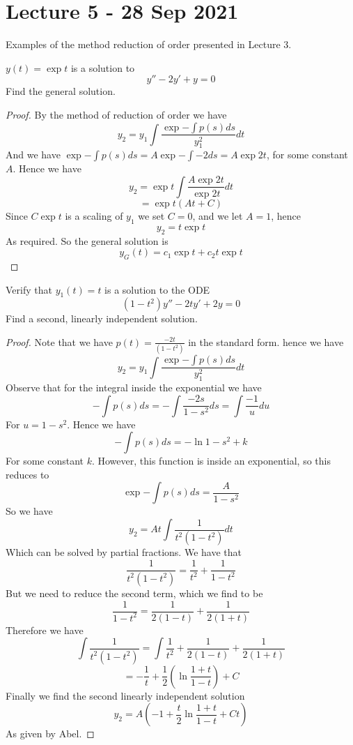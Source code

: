 \section{Lecture 5 - 28 Sep 2021}
Examples of the method reduction of order presented in Lecture 3.
\begin{ex}
  $y(t)=\exp{t}$ is a solution to
  \[ y'' -2y' + y = 0\]
  Find the general solution.
\end{ex}
\begin{proof}
  By the method of reduction of order we have
  \[y_2 = y_1 \int\frac{\exp{-\int p(s)ds}}{y_1^2} dt\]
  And we have $\exp{-\int p(s)ds} = A\exp{-\int -2ds}=A\exp{2t}$, for some constant $A$.
  Hence we have 
  \[y_2 = \exp{t} \int\frac{A\exp{2t}}{\exp{2t}} dt\]
  \[= \exp{t} (At + C)\]
  Since $C\exp{t}$ is a scaling of $y_1$ we set $C=0$, and we let $A=1$, hence 
  \[y_2 = t\exp{t}\]
  As required. So the general solution is 
  \[y_G(t) = c_1\exp{t} + c_2 t\exp{t}\]
\end{proof}

\begin{ex}
  Verify that $y_1(t)=t$ is a solution to the ODE
  \[(1-t^2)y''-2ty'+2y=0\]
  Find a second, linearly independent solution.
\end{ex}
\begin{proof}
  Note that we have $p(t)=\frac{-2t}{(1-t^2)}$ in the standard form. hence we have 
  \[y_2 = y_1 \int \frac{\exp{-\int p(s)ds}}{y_1^2} dt\]
  Observe that for the integral inside the exponential we have
  \[-\int p(s)ds = -\int \frac{-2s}{1-s^2}ds = \int \frac{-1}{u}du\]
  For $u=1-s^2$. Hence we have 
  \[-\int p(s)ds = - \ln{1-s^2} + k\]
  For some constant $k$. However, this function is inside an exponential, so this reduces to 
  \[\exp{-\int p(s)ds} = \frac{A}{1-s^2} \]
  So we have 
  \[y_2 = At \int \frac{1}{t^2(1-t^2)} dt\]
  Which can be solved by partial fractions. We have that
  \[\frac{1}{t^2(1-t^2)} = \frac{1}{t^2} + \frac{1}{1-t^2}\]
  But we need to reduce the second term, which we find to be 
  \[\frac{1}{1-t^2} = \frac{1}{2(1-t)} + \frac{1}{2(1+t)}\]
  Therefore we have
  \[\int \frac{1}{t^2(1-t^2)} = \int \frac{1}{t^2} + \frac{1}{2(1-t)} + \frac{1}{2(1+t)}\]
  \[= -\frac{1}{t} + \frac{1}{2}(\ln{\frac{1+t}{1-t}}) + C\]
  Finally we find the second linearly independent solution
  \[y_2 = A(-1+ \frac{t}{2}\ln{\frac{1+t}{1-t}} + Ct)\]
  As given by Abel.
  
\end{proof}
